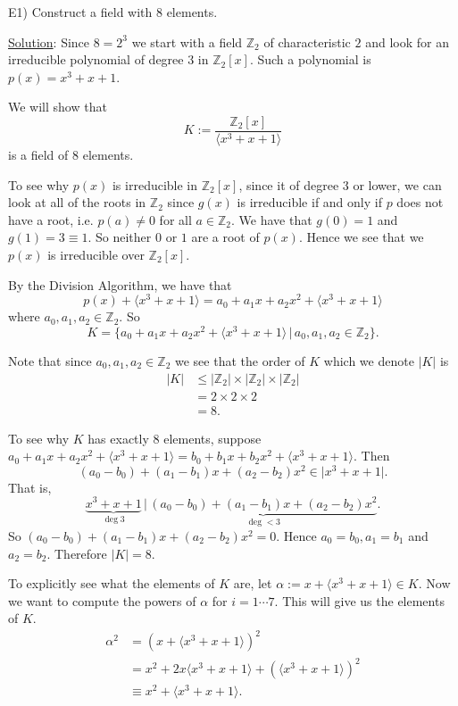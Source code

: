 \documentclass{article}
\begin{document}
E1) Construct a field with $8$ elements.

\underline{Solution}: Since $8 = 2^3$ we start with a field $\mathbb{Z}_2$ of characteristic $2$ and look for an irreducible polynomial of degree $3$ in $\mathbb{Z}_2[x]$. Such a polynomial is $p(x) = x^3+x+1$. 

We will show that
$$K := \frac{\mathbb{Z}_2[x]}{\langle x^3+x+1 \rangle}$$
is a field of $8$ elements.

To see why $p(x)$ is irreducible in $\mathbb{Z}_2[x]$, since it of degree $3$ or lower, we can look at all of the roots in $\mathbb{Z}_2$ since $g(x)$ is irreducible if and only if $p$ does not have a root, i.e. $p(a) \neq 0$ for all $a \in \mathbb{Z}_2$. We have that $g(0) = 1$ and $g(1) = 3 \equiv 1$. So neither $0$ or $1$ are a root of $p(x)$. Hence we see that we $p(x)$ is irreducible over $\mathbb{Z}_2[x]$.

By the Division Algorithm, we have that
$$p(x) + \langle x^3+x+1 \rangle =  a_0 + a_1 x + a_2 x^2 + \langle x^3+x+1 \rangle $$
where $a_0, a_1, a_2 \in \mathbb{Z}_2$. So 
$$ K = \{ a_0 + a_1 x + a_2 x^2 + \langle x^3+x+1 \rangle \, \vert \, a_0, a_1, a_2 \in \mathbb{Z}_2 \}. $$

Note that since $a_0, a_1, a_2 \in \mathbb{Z}_2$ we see that the order of $K$ which we denote $\lvert K \rvert$ is
\begin{align*}
	\lvert K \rvert &\leq \lvert \mathbb{Z}_2 \rvert \times \lvert \mathbb{Z}_2 \rvert \times \lvert \mathbb{Z}_2 \rvert \\
	&= 2 \times 2 \times 2 \\
	&= 8.
\end{align*}

To see why $K$ has exactly $8$ elements, suppose $a_0 + a_1x + a_2x^2 + \langle x^3 + x + 1 \rangle = b_0 + b_1 x + b_2 x^2 + \langle x^3+x+1 \rangle$. Then 
$$(a_0 - b_0) + (a_1-b_1)x + (a_2-b_2)x^2 \in \lvert x^3+x+1 \rvert. $$
That is,
$$ \underbrace{x^3 + x + 1}_{\deg 3} \, \vert \, \underbrace{(a_0-b_0) + (a_1-b_1)x + (a_2-b_2)x^2}_{\deg < 3}. $$
So $(a_0-b_0) + (a_1-b_1)x + (a_2-b_2)x^2 = 0$. Hence $a_0 = b_0, a_1 = b_1$ and $a_2 = b_2$. Therefore $\lvert K \rvert = 8$.

To explicitly see what the elements of $K$ are, let $\alpha := x + \langle x^3+x+1 \rangle \in K$. Now we want to compute the powers of $\alpha$ for $i = 1 \cdots 7$. This will give us the elements of $K$.
\begin{align*}
	\alpha^2 &= (x + \langle x^3 + x + 1\rangle)^2 \\
	&= x^2 + 2x \langle x^3 + x + 1\rangle + (\langle x^3 + x + 1\rangle)^2 \\
	&\equiv x^2 + \langle x^3 + x + 1\rangle.
\end{align*}
\end{document}
